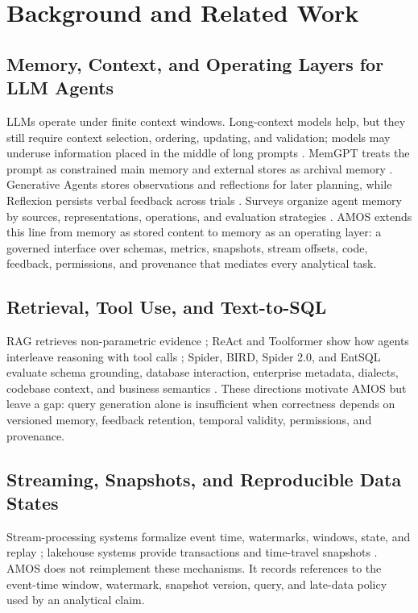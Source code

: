 \documentclass[10pt]{article}
\newcommand{\amos}{\textsc{AMOS}\xspace}
\begin{document}
\section{Background and Related Work}

\subsection{Memory, Context, and Operating Layers for LLM Agents}
LLMs operate under finite context windows. Long-context models help, but they still require context selection, ordering, updating, and validation; models may underuse information placed in the middle of long prompts \cite{lostinthemiddle}. MemGPT treats the prompt as constrained main memory and external stores as archival memory \cite{memgpt}. Generative Agents stores observations and reflections for later planning, while Reflexion persists verbal feedback across trials \cite{generativeagents,reflexion}. Surveys organize agent memory by sources, representations, operations, and evaluation strategies \cite{memorysurvey}. \amos extends this line from memory as stored content to memory as an operating layer: a governed interface over schemas, metrics, snapshots, stream offsets, code, feedback, permissions, and provenance that mediates every analytical task.

\subsection{Retrieval, Tool Use, and Text-to-SQL}
RAG retrieves non-parametric evidence \cite{rag}; ReAct and Toolformer show how agents interleave reasoning with tool calls \cite{react,toolformer}; Spider, BIRD, Spider 2.0, and EntSQL evaluate schema grounding, database interaction, enterprise metadata, dialects, codebase context, and business semantics \cite{spider,bird,spider2,entsql}. These directions motivate \amos but leave a gap: query generation alone is insufficient when correctness depends on versioned memory, feedback retention, temporal validity, permissions, and provenance.

\subsection{Streaming, Snapshots, and Reproducible Data States}
Stream-processing systems formalize event time, watermarks, windows, state, and replay \cite{millwheel,dataflow,flink}; lakehouse systems provide transactions and time-travel snapshots \cite{deltalake}. \amos does not reimplement these mechanisms. It records references to the event-time window, watermark, snapshot version, query, and late-data policy used by an analytical claim.
\end{document}
